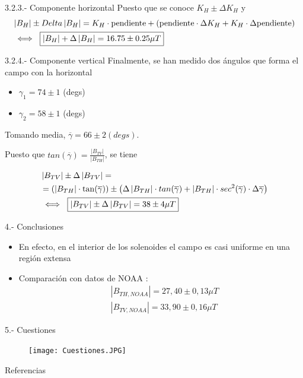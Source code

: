 \documentclass{beamer}
\makeatletter
\providecommand{\abs}[1]{\left|#1\right|}
\newcommand{\commentedbox}[2]{%
  \mbox{
    \begin{tabular}[t]{@{}c@{}}
    $\boxed{\displaystyle#1}$\\
    #2
    \end{tabular}%
  }%
}
\makeatother
\begin{document}
\begin{frame}{3.2.3.- Componente horizontal}
    Puesto que se conoce $K_{H} \pm \Delta K_{H}$ y \pause
    \begin{align*}
        &\abs{B_{H}} \pm Delta \abs{B_{H}} = K_{H} \cdot \text{pendiente} + (\text{pendiente} \cdot \Delta K_{H} + K_{H} \cdot \Delta \text{pendiente}) \nonumber \\
        &\iff \commentedbox{\abs{B_{H}} + \Delta \abs{B_{H}} = 16.75 \pm 0.25 \mu T }{}
    \end{align*}
\end{frame}
\begin{frame}{3.2.4.- Componente vertical}
Finalmente, se han medido dos ángulos que forma el campo con la horizontal
\begin{itemize}
\item $\gamma_{1} = 74 \pm 1$ (degs)
\item $\gamma_{2} = 58 \pm 1$ (degs)
\end{itemize}
\pause Tomando media, $\overline{\gamma} = 66 \pm 2 (degs)$. \pause

Puesto que $tan(\overline{\gamma}) = \frac{\abs{B_{TV}}}{\abs{B_{TH}}}$, se tiene \pause

\begin{align*}
& \abs{B_{TV}} \pm \Delta \abs{B_{TV}} = \\
& = (\abs{B_{TH}} \cdot \tan(\overline{\gamma})) \pm \left( \Delta \abs{B_{TH}} \cdot tan(\overline{\gamma}) + \abs{B_{TH}} \cdot sec^{2}(\overline{\gamma}) \cdot \Delta \overline{\gamma} \right) \\
& \iff \commentedbox{\abs{B_{TV}} \pm \Delta \abs{B_{TV}} = 38 \pm 4 \mu T}{}
\end{align*}
\end{frame}
\begin{frame}{4.- Conclusiones}
\begin{itemize}
\item En efecto, en el interior de los solenoides el campo es casi uniforme en una región extensa
\item Comparación con datos de NOAA \cite{NOAA}:
\begin{align*}
 & \abs{B_{TH,NOAA}} = 27,40 \pm 0,13 \mu T \\
 & \abs{B_{TV,NOAA}} = 33,90 \pm 0,16 \mu T \nonumber
\end{align*}
\end{itemize}
\end{frame}
\begin{frame}{5.- Cuestiones}
\begin{figure}
        \centering
        \texttt{[image: Cuestiones.JPG]}
    \end{figure}
\end{frame}
\begin{frame}{Referencias}


\end{frame}
\end{document}

